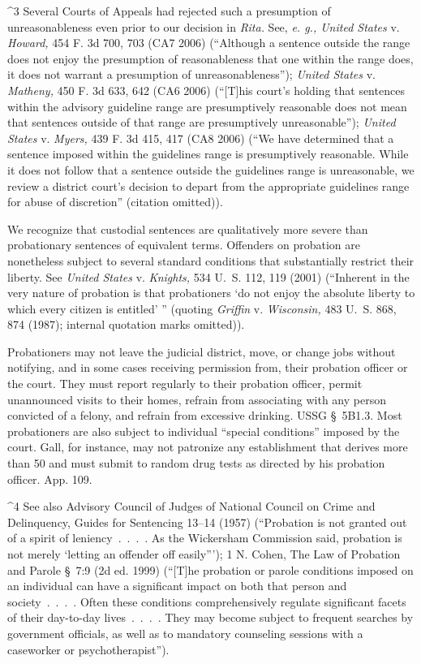 ^3 Several Courts of Appeals had rejected such a presumption of
unreasonableness even prior to our decision in \emph{Rita.} See,
\emph{e. g., United States} v. \emph{Howard,} 454 F. 3d 700, 703 (CA7
2006) (``Although a sentence outside the range does not enjoy the
presumption of reasonableness that one within the range does, it does
not warrant a presumption of unreasonableness''); \emph{United States} v.
\emph{Matheny,} 450 F. 3d 633, 642 (CA6 2006) (``[T]his court's holding
that sentences within the advisory guideline range are presumptively
reasonable does not mean that sentences outside of that range are
presumptively unreasonable''); \emph{United States} v. \emph{Myers,} 439 F.
3d 415, 417 (CA8 2006) (``We have determined that a sentence imposed
within the guidelines range is presumptively reasonable. While it does
not follow that a sentence outside the guidelines range is unreasonable,
we review a district court's decision to depart from the appropriate
guidelines range for abuse of discretion'' (citation omitted)).

  We recognize that custodial sentences are qualitatively more
severe than probationary sentences of equivalent terms. Offenders
on probation are nonetheless subject to several standard conditions
that substantially restrict their liberty. See \emph{United States}
v. \emph{Knights,} 534 U.~S. 112, 119 (2001) (``Inherent in the very
nature of probation is that probationers ‘do not enjoy the absolute
liberty to which every citizen is entitled' '' (quoting \emph{Griffin}
v. \emph{Wisconsin,} 483 U.~S. 868, 874 (1987); internal quotation marks
omitted)).\footnotemark[4]

        Probationers may not leave the judicial district, move, or
change jobs without notifying, and in some cases receiving permission
from, their probation officer or the court. They must report regularly
to their probation officer, permit unannounced visits to their homes,
refrain from associating with any person convicted of a felony, and
refrain from excessive drinking. USSG \S~5B1.3. Most probationers
are also subject to individual ``special conditions'' imposed by the
court. Gall, for instance, may not patronize any establishment that
\newpage  derives more than 50%
and must submit to random drug tests as directed by his probation
officer. App. 109.


^4 See also Advisory Council of Judges of National Council on Crime
and Delinquency, Guides for Sentencing 13--14 (1957) (``Probation is
not granted out of a spirit of leniency~.~.~.~. As the Wickersham
Commission said, probation is not merely ‘letting an offender off
easily'''); 1 N. Cohen, The Law of Probation and Parole \S~7:9
(2d ed. 1999) (``[T]he probation or parole conditions imposed on
an individual can have a significant impact on both that person
and society~.~.~.~. Often these conditions comprehensively
regulate significant facets of their day-to-day lives~.~.~.~.
They may become subject to frequent searches by government officials,
as well as to mandatory counseling sessions with a caseworker or
psychotherapist'').



